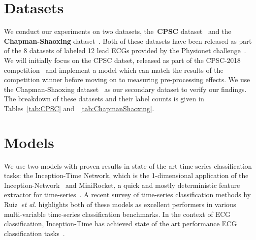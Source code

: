 \documentclass{article}
\begin{document}
\section{Datasets}
\label{datasets}
We conduct our experiments on two datasets, the~\textbf{CPSC} dataset~\cite{liu2018open} and the \textbf{Chapman-Shaoxing} dataset~\cite{zheng202012}. Both of these datasets have been released as part of the 8 datasets of labeled 12 lead ECGs provided by the Physionet challenge~\cite{reyna2021will,reyna4issues}. We will initially focus on the CPSC datset, released as part of the CPSC-2018 competition~\cite{liu2018open} and implement a model which can match the results of the competition winner before moving on to measuring pre-processing effects. We use the Chapman-Shaoxing dataset~\cite{zheng202012} as our secondary dataset to verify our findings. The breakdown of these datasets and their label counts is given in Tables~\ref{tab:CPSC} and ~\ref{tab:ChapmanShaoxing}.

\section{Models}
\label{sec:models}
We use two models with proven results in state of the art time-series classification tasks: the Inception-Time Network, which is the 1-dimensional application of the Inception-Network~\cite{szegedy2017inception,ismail2020inceptiontime} and MiniRocket, a quick and mostly deterministic feature extractor for time-series~\cite{dempster2021minirocket}. A recent survey of time-series classification methods by Ruiz~\textit{et al.} highlights both of these models as excellent performers in various multi-variable time-series classification benchmarks. In the context of ECG classification, Inception-Time has achieved state of the art performance ECG classification tasks~\cite{Strodthoff2021}. 


\end{document}
